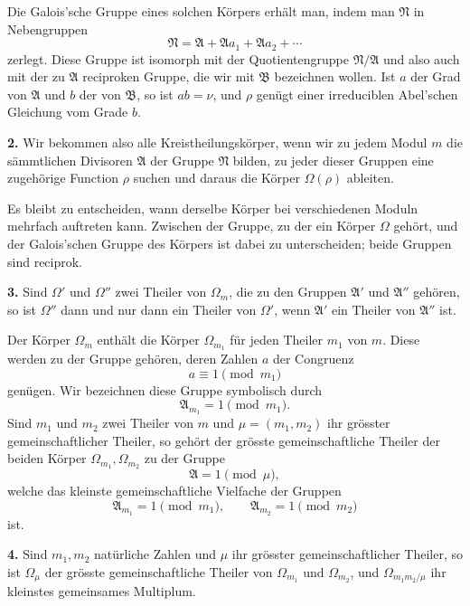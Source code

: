\documentclass[11pt]{article}
\providecommand{\grpA}{\mathfrak A}
\providecommand{\grpB}{\mathfrak B}
\providecommand{\grpN}{\mathfrak N}
\begin{document}
Die Galois'sche Gruppe eines solchen Körpers erhält man, indem man $\grpN$ in Nebengruppen
\[
 \grpN=\grpA+\grpA a_1+\grpA a_2+\cdots
\]
zerlegt. Diese Gruppe ist isomorph mit der Quotientengruppe $\grpN/\grpA$ und also auch mit der zu $\grpA$ reciproken Gruppe, die wir mit $\grpB$ bezeichnen wollen. Ist $a$ der Grad von $\grpA$ und $b$ der von $\grpB$, so ist $ab=\nu$, und $\rho$ genügt einer irreduciblen Abel'schen Gleichung vom Grade $b$.

\medskip
\noindent\textbf{2.} Wir bekommen also alle Kreistheilungskörper, wenn wir zu jedem Modul $m$ die sämmtlichen Divisoren $\grpA$ der Gruppe $\grpN$ bilden, zu jeder dieser Gruppen eine zugehörige Function $\rho$ suchen und daraus die Körper $\Omega(\rho)$ ableiten.

Es bleibt zu entscheiden, wann derselbe Körper bei verschiedenen Moduln mehrfach auftreten kann. Zwischen der Gruppe, zu der ein Körper $\Omega$ gehört, und der Galois'schen Gruppe des Körpers ist dabei zu unterscheiden; beide Gruppen sind reciprok.

\medskip
\noindent\textbf{3.} Sind $\Omega'$ und $\Omega''$ zwei Theiler von $\Omega_m$, die zu den Gruppen $\grpA'$ und $\grpA''$ gehören, so ist $\Omega''$ dann und nur dann ein Theiler von $\Omega'$, wenn $\grpA'$ ein Theiler von $\grpA''$ ist.

Der Körper $\Omega_m$ enthält die Körper $\Omega_{m_1}$ für jeden Theiler $m_1$ von $m$. Diese werden zu der Gruppe gehören, deren Zahlen $a$ der Congruenz
\begin{equation}
 a\equiv1\pmod {m_1}
\tag{4}
\end{equation}
genügen. Wir bezeichnen diese Gruppe symbolisch durch
\begin{equation}
 \grpA_{m_1}=1\pmod {m_1}.
\tag{5}
\end{equation}
Sind $m_1$ und $m_2$ zwei Theiler von $m$ und $\mu=(m_1,m_2)$ ihr grösster gemeinschaftlicher Theiler, so gehört der grösste gemeinschaftliche Theiler der beiden Körper $\Omega_{m_1},\Omega_{m_2}$ zu der Gruppe
\begin{equation}
 \grpA=1\pmod \mu,
\tag{7}
\end{equation}
welche das kleinste gemeinschaftliche Vielfache der Gruppen
\begin{equation}
 \grpA_{m_1}=1\pmod {m_1},\qquad
 \grpA_{m_2}=1\pmod {m_2}
\tag{6}
\end{equation}
ist.

\medskip
\noindent\textbf{4.} Sind $m_1,m_2$ natürliche Zahlen und $\mu$ ihr grösster gemeinschaftlicher Theiler, so ist $\Omega_\mu$ der grösste gemeinschaftliche Theiler von $\Omega_{m_1}$ und $\Omega_{m_2}$, und $\Omega_{m_1m_2/\mu}$ ihr kleinstes gemeinsames Multiplum.
\end{document}
